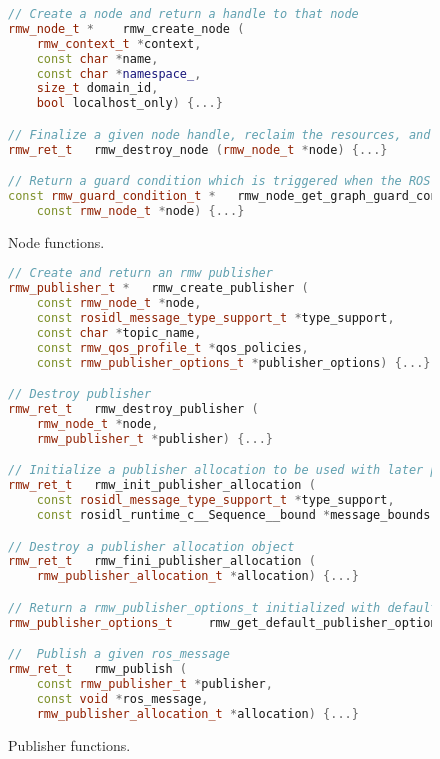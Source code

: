         \begin{figure}[htbp]
            \begin{lstlisting}[language=C++]
// Create a node and return a handle to that node
rmw_node_t * 	rmw_create_node (
    rmw_context_t *context, 
    const char *name, 
    const char *namespace_, 
    size_t domain_id, 
    bool localhost_only) {...}

// Finalize a given node handle, reclaim the resources, and deallocate the node handle
rmw_ret_t 	rmw_destroy_node (rmw_node_t *node) {...}

// Return a guard condition which is triggered when the ROS graph changes
const rmw_guard_condition_t * 	rmw_node_get_graph_guard_condition (
    const rmw_node_t *node) {...}
\end{lstlisting}
            \label{fig:funnode}
            \caption{Node functions.}
        \end{figure}


        \begin{figure}[htbp]
            \begin{lstlisting}[language=C++]
// Create and return an rmw publisher
rmw_publisher_t * 	rmw_create_publisher (
    const rmw_node_t *node, 
    const rosidl_message_type_support_t *type_support, 
    const char *topic_name, 
    const rmw_qos_profile_t *qos_policies, 
    const rmw_publisher_options_t *publisher_options) {...}

// Destroy publisher
rmw_ret_t 	rmw_destroy_publisher (
    rmw_node_t *node, 
    rmw_publisher_t *publisher) {...}

// Initialize a publisher allocation to be used with later publications
rmw_ret_t 	rmw_init_publisher_allocation (
    const rosidl_message_type_support_t *type_support, 
    const rosidl_runtime_c__Sequence__bound *message_bounds, rmw_publisher_allocation_t *allocation) {...}

// Destroy a publisher allocation object
rmw_ret_t 	rmw_fini_publisher_allocation (
    rmw_publisher_allocation_t *allocation) {...}

// Return a rmw_publisher_options_t initialized with default values
rmw_publisher_options_t 	rmw_get_default_publisher_options (void) {...}

// 	Publish a given ros_message
rmw_ret_t 	rmw_publish (
    const rmw_publisher_t *publisher, 
    const void *ros_message, 
    rmw_publisher_allocation_t *allocation) {...}
\end{lstlisting}
            \caption{Publisher functions.}
            \label{fig:funpub}
        \end{figure}


